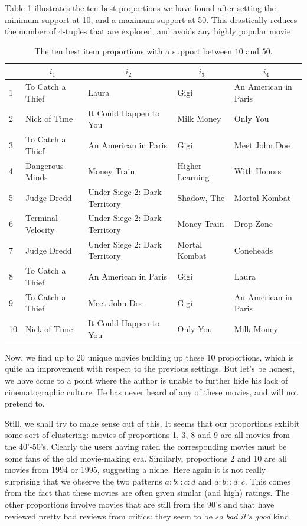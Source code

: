 Table \ref{TAB:best_prop_num_basic_10_50} illustrates the ten best proportions
we have found after setting the minimum support at 10, and a maximum support at
50. This drastically reduces the number of $4$-tuples that are explored, and
avoids any highly popular movie.
\begin{table}[h!]
\centering
  \begin{tabular}{ l l  l  l l }
\toprule
    &\multicolumn{1}{c}{$i_1$}  & \multicolumn{1}{c}{$i_2$} &
    \multicolumn{1}{c}{$i_3$} & \multicolumn{1}{c}{$i_4$}\\
  \midrule
  1&   To Catch a Thief  & Laura  & Gigi  & An American in Paris  \\
  2&   Nick of Time  & It Could Happen to You  & Milk Money & Only You  \\
  3& To Catch a Thief  & An American in Paris  & Gigi  & Meet John Doe   \\
  4& Dangerous Minds  & Money Train  & Higher Learning  & With Honors   \\
  5& Judge Dredd  & Under Siege 2: Dark Territory  & Shadow, The  & Mortal Kombat   \\
  6& Terminal Velocity & Under Siege 2: Dark Territory  & Money Train  & Drop Zone    \\
  7& Judge Dredd  &Under Siege 2: Dark Territory  &  Mortal Kombat  & Coneheads   \\
  8& To Catch a Thief  & An American in Paris  & Gigi  & Laura   \\
  9&  To Catch a Thief  & Meet John Doe  & Gigi  & An American in Paris   \\
 10&   Nick of Time  & It Could Happen to You  & Only You  & Milk Money   \\
\bottomrule
\end{tabular}
  \caption{The ten best item proportions with a support between $10$ and $50$.}
  \label{TAB:best_prop_num_basic_10_50}
\end{table}
Now, we find up to 20 unique movies building up these 10 proportions, which is
quite an improvement with respect to the previous settings. But let's be
honest, we have come to a point where the author is unable to further hide his
lack of cinematographic culture. He has never heard of any of these movies, and
will not pretend to.

Still, we shall try to make sense out of this. It seems that our proportions
exhibit some sort of clustering: movies of proportions 1, 3, 8 and 9 are all
movies from the 40'-50's. Clearly the users having rated the corresponding
movies must be some fans of the old movie-making era. Similarly, proportions 2
and 10 are all movies from 1994 or 1995, suggesting a niche. Here again it is
not really surprising that we observe the two patterns $a:b::c:d$ and
$a:b::d:c$. This comes from the fact that these movies are often given similar
(and high) ratings. The other proportions involve movies that are still from the
90's and that have reviewed pretty bad reviews from critics: they seem to be
\textit{so bad it's good} kind.

